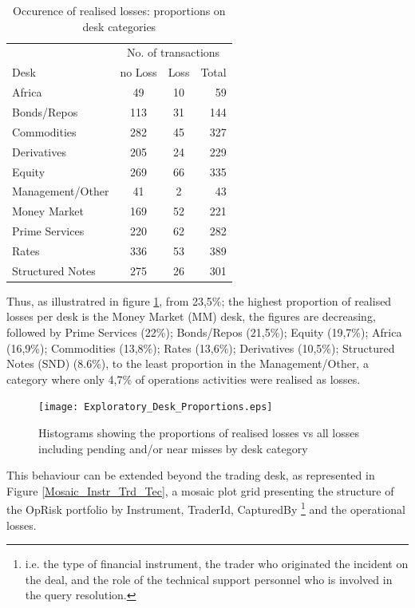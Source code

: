 \documentclass{DissertateUSU}
\begin{document}
\doublespacing

\begin{table}[ht]
\centering
\caption{Occurence of realised losses: proportions on desk categories}
\begin{tabular}{lccr}
\toprule
  & \multicolumn{3}{c}{No. of transactions} \\
Desk   & no Loss   & Loss & Total\\ 
\midrule
  Africa            &  49 & 10 &  59 \\
  Bonds/Repos       & 113 & 31 & 144 \\
  Commodities       & 282 & 45 & 327 \\
  Derivatives       & 205 & 24 & 229 \\
  Equity            & 269 & 66 & 335 \\
  Management/Other  &  41 &  2 &  43 \\
  Money Market      & 169 & 52 & 221 \\
  Prime Services    & 220 & 62 & 282 \\
  Rates             & 336 & 53 & 389 \\
  Structured Notes  & 275 & 26 & 301 \\
 \bottomrule
\end{tabular}\label{tab_Desk_Prop}
\end{table}

Thus, as illustratred in figure \ref{Desk_Proportions}, from 23,5\%; the
highest proportion of realised losses per desk is the Money Market (MM)
desk, the figures are decreasing, followed by Prime Services (22\%);
Bonds/Repos (21,5\%); Equity (19,7\%); Africa (16,9\%); Commodities
(13,8\%); Rates (13,6\%); Derivatives (10,5\%); Structured Notes (SND)
(8.6\%), to the least proportion in the Management/Other, a category
where only 4,7\% of operations activities were realised as losses.

\singlespacing

\doublespacing

\begin{figure}
\centering
\texttt{[image: Exploratory\_Desk\_Proportions.eps]}
\caption[Desk category by realised losses]{Histograms showing the proportions of realised losses vs all losses including pending and/or near misses by desk category}
\label{Desk_Proportions}
\end{figure}

This behaviour can be extended beyond the trading desk, as represented
in Figure \ref{Mosaic_Instr_Trd_Tec}, a mosaic plot grid presenting the
structure of the OpRisk portfolio by Instrument, TraderId, CapturedBy
\footnote{i.e. the type of financial instrument, the trader who originated the incident on the deal, and the role of the technical support personnel who is involved in the query resolution.}
and the operational losses.
\end{document}
